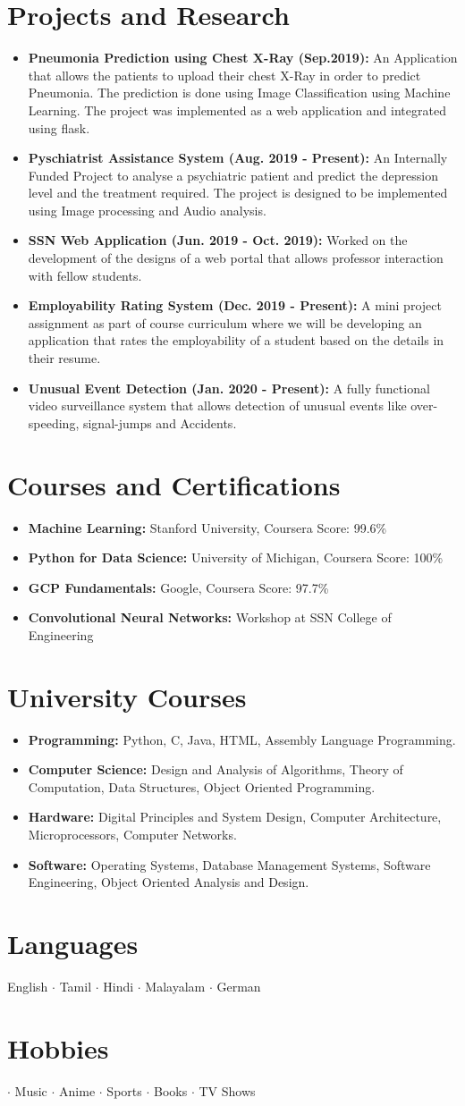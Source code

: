 \documentclass[letterpaper,12pt]{article}
\newcommand{\resumeItem}[2]{
\item\small{
\textbf{#1}{ #2 \vspace{-2pt}}
}
}
\newcommand{\resumeSubHeadingListStart}{\begin{itemize}[leftmargin=*]}
\newcommand{\resumeSubHeadingListEnd}{\end{itemize}}
\begin{document}
\section{Projects and Research}
\resumeSubHeadingListStart
\resumeItem{Pneumonia Prediction using Chest X-Ray (Sep.2019):}{An Application that allows the patients to upload their chest X-Ray in order to predict Pneumonia. The prediction is done using Image Classification using Machine Learning. The project was implemented as a web application and integrated using flask. }
\resumeItem{Pyschiatrist Assistance System (Aug. 2019 - Present):}{An Internally Funded Project to analyse a psychiatric patient and predict the depression level and the treatment required. The project is designed to be implemented using Image processing and Audio analysis.}
\resumeItem{SSN Web Application (Jun. 2019 - Oct. 2019):}{Worked on the development of the designs of a web portal that allows professor interaction with fellow students.}
\resumeItem{Employability Rating System (Dec. 2019 - Present):}{A mini project assignment as part of course curriculum where we will be developing an application that rates the employability of a student based on the details in their resume.}
\resumeItem{Unusual Event Detection (Jan. 2020 - Present):}{ A fully functional video surveillance system that allows detection of unusual events like over-speeding, signal-jumps and Accidents.
}
\resumeSubHeadingListEnd


\section{Courses and Certifications}
\resumeSubHeadingListStart
\resumeItem{Machine Learning:}{Stanford University, Coursera}{Score: 99.6\%}
\resumeItem{Python for Data Science:}{University of Michigan, Coursera}{Score: 100\%}
\resumeItem{GCP Fundamentals:}{Google, Coursera}{Score: 97.7\%}
\resumeItem{Convolutional Neural Networks:}{Workshop at SSN College of Engineering}
\resumeSubHeadingListEnd
\section{University Courses}
\resumeSubHeadingListStart
\resumeItem{Programming:}{Python, C, Java, HTML, Assembly Language Programming.}
\resumeItem{Computer Science:}{Design and Analysis of Algorithms, Theory of Computation,  Data Structures, Object Oriented Programming.}
\resumeItem{Hardware:}{Digital Principles and System Design, Computer Architecture, Microprocessors,  Computer Networks.}
\resumeItem{Software:}{Operating Systems, Database Management Systems, Software Engineering, Object Oriented Analysis and Design.}
\resumeSubHeadingListEnd

\section{Languages}
English $\cdot$ Tamil $\cdot$ Hindi $\cdot$ Malayalam  $\cdot$ German

\section{Hobbies}
 $\cdot$ Music $\cdot$ Anime $\cdot$ Sports $\cdot$ Books $\cdot$ TV Shows
\end{document}
